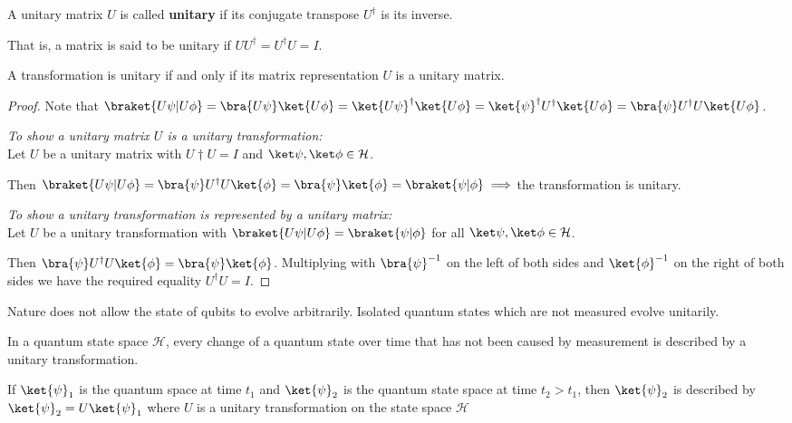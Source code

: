 \begin{defn}
    A unitary matrix $U$ is called \textbf{unitary} if its conjugate transpose $U^\dagger$ is its inverse.

    That is, a matrix is said to be unitary if $U U^\dagger = U^\dagger U = I$.
\end{defn}

\begin{thm}
A transformation is unitary if and only if its matrix representation $U$ is a unitary matrix.
\end{thm}
\begin{proof}
    Note that $\braket{U \psi | U \phi} = \bra{U \psi} \ket{U \phi} = \ket{U \psi}^\dagger \ket{U \phi} = \ket{\psi}^\dagger U^\dagger \ket{U \phi} = \bra{\psi} U^\dagger U \ket{U\phi}$.

    \emph{To show a unitary matrix $U$ is a unitary transformation: }\\
    Let $U$ be a unitary matrix with $U\dagger U = I$ and $\ket\psi, \ket\phi \in \mathcal{H}$.

    Then $\braket{U \psi | U \phi} = \bra{\psi} U^\dagger U \ket{\phi} = \bra{\psi} \ket{\phi} = \braket{\psi|\phi} \implies $the transformation is unitary.

    \emph{To show a unitary transformation is represented by a unitary matrix: }\\
    Let $U$ be a unitary transformation with $\braket{U \psi | U \phi} = \braket{\psi|\phi}$ for all $\ket\psi, \ket\phi \in \mathcal{H}$.

    Then  $\bra{\psi} U^\dagger U \ket{\phi} = \bra{\psi} \ket{\phi}$.
    Multiplying with $\bra{\psi}^{-1}$ on the left of both sides and $\ket{\phi}^{-1}$ on the right of both sides we have the required equality $U^\dagger U = I$.
\end{proof}

Nature does not allow the state of qubits to evolve arbitrarily. Isolated quantum states which are not measured evolve unitarily.

\begin{samepage}
\begin{mdframed}
\begin{lemma}
    \label{transformation}
    In a quantum state space $\mathcal{H}$, every change of a quantum state over time that has not been caused by measurement is described by a unitary transformation.
    
    If $\ket{\psi}_1$ is the quantum space at time $t_1$ and $\ket{\psi}_2$ is the quantum state space at time $t_2 > t_1$, then $\ket{\psi}_2$ is described by $\ket{\psi}_2 = U \ket{\psi}_1$ where $U$ is a unitary transformation on the state space $\mathcal{H}$
\end{lemma}
\end{mdframed}
\end{samepage}

